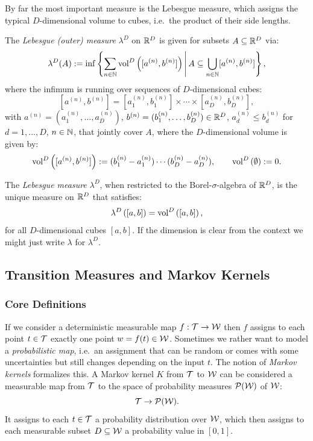 By far the most important measure is the Lebesgue measure, which assigns the typical $D$-dimensional volume to cubes, i.e.\
the product of their side lengths.

\begin{Def}
    The \emph{Lebesgue (outer) measure} $\lambda^D$ on $\mathbb{R}^D$ is given for subsets $A \subseteq \mathbb{R}^D$ via:
    \[ \lambda^D(A) := \inf\left \{ \sum_{n \in \mathbb{N}} \mathrm{vol}^D\left ( [a^{(n)},b^{(n)}] \right )  \,\middle|\,  
    A \subseteq \bigcup_{n \in \mathbb{N}} [a^{(n)},b^{(n)}]  \right \}, \]
    where the infimum is running over sequences of $D$-dimensional cubes:
     \[ [a^{(n)},b^{(n)}] = [a_1^{(n)},b_1^{(n)}] \times \cdots \times [a_D^{(n)}, b_D^{(n)}],\]
  with $a^{(n)}=(a_1^{(n)},\dots,a_D^{(n)})$, $b^{(n)}=(b_1^{(n)},\dots,b_D^{(n)}) \in \mathbb{R}^D$, $a_d^{(n)} \le b_d^{(n)}$ for $d=1,\dots,D$, $n \in \mathbb{N}$, that jointly cover $A$, where the $D$-dimensional volume is given by:
  \[ \mathrm{vol}^D\left ( [a^{(n)},b^{(n)}] \right ) := (b_1^{(n)}-a_1^{(n)}) \cdots (b_D^{(n)}-a_D^{(n)}),\qquad \mathrm{vol}^D\left ( \emptyset \right ) :=0. \]
\end{Def}

\begin{Thm}
 The \emph{Lebesgue measure} $\lambda^D$, when restricted to the Borel-$\sigma$-algebra of $\mathbb{R}^D$,
  is the unique measure on $\mathbb{R}^D$ that satisfies:
    \[ \lambda^D\left ( [a,b] \right ) = \mathrm{vol}^D\left ( [a,b] \right ),     \]
    for all $D$-dimensional cubes $[a,b]$.
    If the dimension is clear from the context we might just write $\lambda$ for $\lambda^D$.
\end{Thm}


\subsection{Transition Measures and Markov Kernels}

\subsubsection{Core Definitions}

\begin{Motivation}
 If we consider a deterministic measurable map $f: \mathcal{T} \to \mathcal{W}$ then $f$ assigns to each point $t \in \mathcal{T}$ exactly one point $w=f(t) \in \mathcal{W}$.
 Sometimes we rather want to model a \emph{probabilistic map}, i.e.\ an assignment that can be random or comes with some uncertainties but still changes depending on the input $t$. 
 The notion of \emph{Markov kernels} formalizes this. 
A Markov kernel $K$ from $\mathcal{T}$ to $\mathcal{W}$
can be considered  a measurable map from $\mathcal{T}$ to the space of probability measures $\mathcal{P}(\mathcal{W})$ of $\mathcal{W}$:
    \[ \mathcal{T} \to \mathcal{P}(\mathcal{W}).\]
 It assigns to each $t \in \mathcal{T}$ a probability distribution over $\mathcal{W}$, which then assigns to 
    each measurable subset $D \subseteq \mathcal{W}$ a probability value in $[0,1]$.
\end{Motivation}

